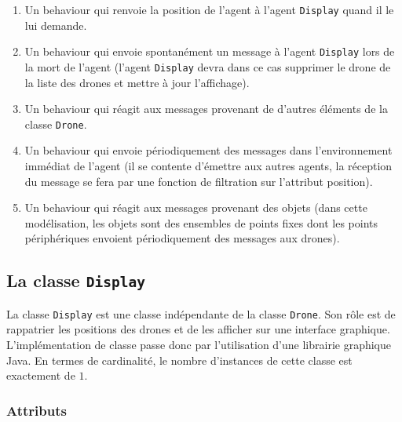 \documentclass[11pt]{report}
\begin{document}
\begin{enumerate}
\item Un behaviour qui renvoie la position de l'agent à l'agent \verb|Display| quand il le lui demande.

\item Un behaviour qui envoie spontanément un message à l'agent \verb|Display| lors de la mort de l'agent (l'agent \verb|Display| devra dans ce cas supprimer le drone de la liste des drones et mettre à jour l'affichage).

\item Un behaviour qui réagit aux messages provenant de d'autres éléments de la classe \verb|Drone|.

\item Un behaviour qui envoie périodiquement des messages dans l'environnement immédiat de l'agent (il se contente d'émettre aux autres agents, la réception du message se fera par une fonction de filtration sur l'attribut position).

\item Un behaviour qui réagit aux messages provenant des objets (dans cette modélisation, les objets sont des ensembles de points fixes dont les points périphériques envoient périodiquement des messages aux drones).
\end{enumerate}

\newpage
\subsection{La classe \protect\Verb+Display+}

La classe \verb|Display| est une classe indépendante de la classe \verb|Drone|. Son rôle est de rappatrier les positions des drones et de les afficher sur une interface graphique. L'implémentation de classe passe donc par l'utilisation d'une librairie graphique Java. En termes de cardinalité, le nombre d'instances de cette classe est exactement de $1$.

\subsubsection{Attributs}
\end{document}
